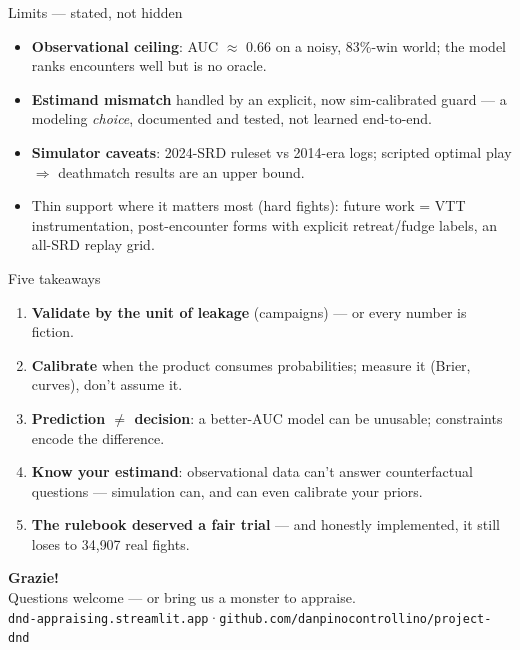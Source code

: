 \documentclass[aspectratio=169,11pt]{beamer}
\begin{document}
\begin{frame}{Limits — stated, not hidden}
  \begin{itemize}
    \item \textbf{Observational ceiling}: AUC $\approx$ 0.66 on a noisy, 83\%-win world; the model ranks encounters well but is no oracle.
    \item \textbf{Estimand mismatch} handled by an explicit, now sim-calibrated guard — a modeling \emph{choice}, documented and tested, not learned end-to-end.
    \item \textbf{Simulator caveats}: 2024-SRD ruleset vs 2014-era logs; scripted optimal play $\Rightarrow$ deathmatch results are an upper bound.
    \item Thin support where it matters most (hard fights): future work = VTT instrumentation, post-encounter forms with explicit retreat/fudge labels, an all-SRD replay grid.
  \end{itemize}
\end{frame}

\begin{frame}{Five takeaways}
  \begin{enumerate}
    \item \textbf{Validate by the unit of leakage} (campaigns) — or every number is fiction.
    \item \textbf{Calibrate} when the product consumes probabilities; measure it (Brier, curves), don't assume it.
    \item \textbf{Prediction $\neq$ decision}: a better-AUC model can be unusable; constraints encode the difference.
    \item \textbf{Know your estimand}: observational data can't answer counterfactual questions — simulation can, and can even calibrate your priors.
    \item \textbf{The rulebook deserved a fair trial} — and honestly implemented, it still loses to 34{,}907 real fights.
  \end{enumerate}
\end{frame}

{
\begin{frame}[plain]
  \vfill\centering
  {\color{white}\Huge\bfseries Grazie!\\[2ex]}
  {\color{white}\large Questions welcome — or bring us a monster to appraise.\\[3ex]}
  {\color{white!80!sapienzaRed}\small \texttt{dnd-appraising.streamlit.app}\quad·\quad\texttt{github.com/danpinocontrollino/project-dnd}}
  \vfill
\end{frame}}
\end{document}
